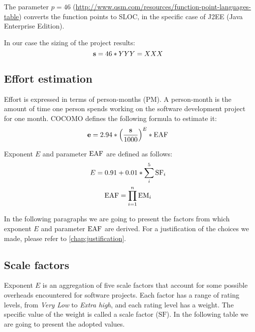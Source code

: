 The parameter $ p = 46 $ (\url{http://www.qsm.com/resources/function-point-languages-table}) converts the function points to SLOC, in the specific case of J2EE (Java Enterprise Edition).

In our case the sizing of the project results:
\begin{equation}
%
	\mSize = 46 * YYY = XXX  %
%
\end{equation}



\subsection{Effort estimation}

Effort is expressed in terms of \mbox{person-months} (PM). A {person-month} is the amount of time one person spends working on the software development project for one month. COCOMO defines the following formula to estimate it:
\begin{equation}
%
	\mEffort = 2.94 * { \left( \frac{\mSize}{1000} \right) }^{E} * \eaf \label{eqn:effort}
%
\end{equation}


Exponent $ E $ and parameter $ \text{EAF} $ are defined as follows:
\begin{gather}
%
	E = 0.91 + 0.01 * \sum_{i}^{5} \text{SF}_i \label{eqn:Eexp}\\%
%
	\eaf     = \prod_{i=1}^{n} \text{EM}_i \label{eqn:eaf}
%
\end{gather}




In the following paragraphs we are going to present the factors from which exponent $ E $ and parameter $ \text{EAF} $ are derived. For a justification of the choices we made, please refer to \cref{chap:justification}.









\subsection*{Scale factors} Exponent $ E $ is an aggregation of five scale factors that account for some possible overheads encountered for software projects. Each factor has a range of rating levels, from \emph{Very Low} to \emph{Extra high}, and each rating level has a weight. The specific value of the weight is called a scale factor ($ \text{SF} $). In the following table we are going to present the adopted values.



